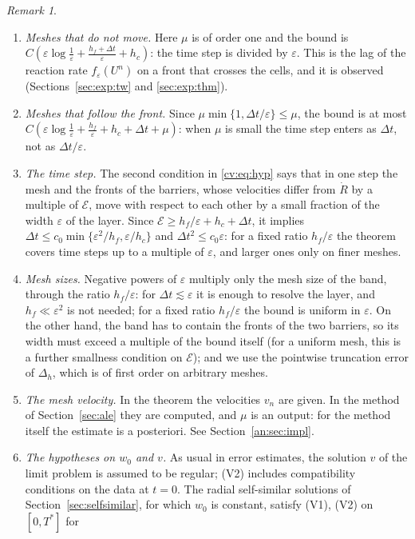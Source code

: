 \documentclass[11pt]{amsart}
\theoremstyle{definition}
\theoremstyle{remark}
\newtheorem{remark}[theorem]{Remark}
\newcommand{\ve}{\varepsilon}
\begin{document}
\begin{remark}\label{cv:rem:main}
\begin{enumerate}
\item \emph{Meshes that do not move.} Here $\mu$ is of order one and the bound is
$C(\ve\log\frac1\ve+\frac{h_f+\Delta t}{\ve}+h_c)$: the time step is divided by $\ve$. This is
the lag of the reaction rate $f_\ve(U^n)$ on a front that crosses the cells, and it is
observed (Sections~\ref{sec:exp:tw} and \ref{sec:exp:thm}).
\item \emph{Meshes that follow the front.} Since $\mu\min\{1,\Delta t/\ve\}\le\mu$, the bound is
at most $C(\ve\log\frac1\ve+\frac{h_f}{\ve}+h_c+\Delta t+\mu)$: when $\mu$ is small the time step
enters as $\Delta t$, not as $\Delta t/\ve$.
\item \emph{The time step.} The second condition in \eqref{cv:eq:hyp} says that in one
step the mesh and the fronts of the barriers, whose velocities differ from $\dot R$ by a
multiple of $\mathcal E$, move with respect to each other by a small fraction of the width
$\ve$ of the layer. Since $\mathcal E\ge h_f/\ve+h_c+\Delta t$, it implies
$\Delta t\le c_0\min\{\ve^2/h_f,\ve/h_c\}$ and $\Delta t^2\le c_0\ve$: for a fixed ratio $h_f/\ve$ the theorem
covers time steps up to a multiple of $\ve$, and larger ones only on finer meshes.
\item \emph{Mesh sizes.} Negative powers of $\ve$ multiply only the mesh size of the band,
through the ratio $h_f/\ve$: for $\Delta t\lesssim\ve$ it is enough to resolve the layer, and
$h_f\ll\ve^2$ is not needed; for a fixed ratio $h_f/\ve$ the bound is uniform in $\ve$. On
the other hand, the band has to contain the fronts of the two barriers, so its width
must exceed a multiple of the bound itself (for a uniform mesh, this is a further
smallness condition on $\mathcal E$); and we use the pointwise truncation error of $\Delta_h$,
which is of first order on arbitrary meshes.
\item \emph{The mesh velocity.} In the theorem the velocities $v_n$ are given. In the
method of Section~\ref{sec:ale} they are computed, and $\mu$ is an output: for the
method itself the estimate is a posteriori. See Section~\ref{an:sec:impl}.
\item \emph{The hypotheses on $w_0$ and $v$.} As usual in error estimates, the solution
$v$ of the limit problem is assumed to be regular; (V2) includes compatibility conditions
on the data at $t=0$. The radial self-similar solutions of
Section~\ref{sec:selfsimilar}, for which $w_0$ is constant, satisfy (V1), (V2) on $[0,T^*]$ for

\end{enumerate}
\end{remark}
\end{document}

